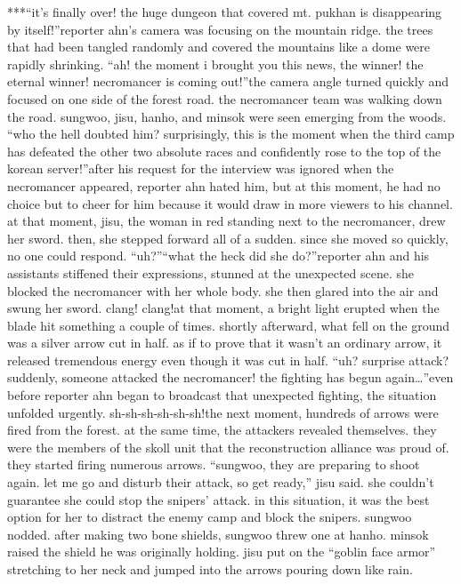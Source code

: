 ***“it’s finally over! the huge dungeon that covered mt.
 pukhan is disappearing by itself!”reporter ahn’s camera was focusing on the mountain ridge.
 the trees that had been tangled randomly and covered the mountains like a dome were rapidly shrinking.
“ah! the moment i brought you this news, the winner! the eternal winner! necromancer is coming out!”the camera angle turned quickly and focused on one side of the forest road.
the necromancer team was walking down the road.
 sungwoo, jisu, hanho, and minsok were seen emerging from the woods.
“who the hell doubted him? surprisingly, this is the moment when the third camp has defeated the other two absolute races and confidently rose to the top of the korean server!”after his request for the interview was ignored when the necromancer appeared, reporter ahn hated him, but at this moment, he had no choice but to cheer for him because it would draw in more viewers to his channel.
at that moment, jisu, the woman in red standing next to the necromancer, drew her sword.
then, she stepped forward all of a sudden.
since she moved so quickly, no one could respond.
“uh?”“what the heck did she do?”reporter ahn and his assistants stiffened their expressions, stunned at the unexpected scene.
 she blocked the necromancer with her whole body.
 she then glared into the air and swung her sword.
clang! clang!at that moment, a bright light erupted when the blade hit something a couple of times.
shortly afterward, what fell on the ground was a silver arrow cut in half.
as if to prove that it wasn’t an ordinary arrow, it released tremendous energy even though it was cut in half.
“uh? surprise attack? suddenly, someone attacked the necromancer! the fighting has begun again…”even before reporter ahn began to broadcast that unexpected fighting, the situation unfolded urgently.
sh-sh-sh-sh-sh-sh!the next moment, hundreds of arrows were fired from the forest.
at the same time, the attackers revealed themselves.
 they were the members of the skoll unit that the reconstruction alliance was proud of.
 they started firing numerous arrows.
“sungwoo, they are preparing to shoot again.
 let me go and disturb their attack, so get ready,” jisu said.
 she couldn’t guarantee she could stop the snipers’ attack.
 in this situation, it was the best option for her to distract the enemy camp and block the snipers.
sungwoo nodded.
 after making two bone shields, sungwoo threw one at hanho.
minsok raised the shield he was originally holding.
jisu put on the “goblin face armor” stretching to her neck and jumped into the arrows pouring down like rain.
